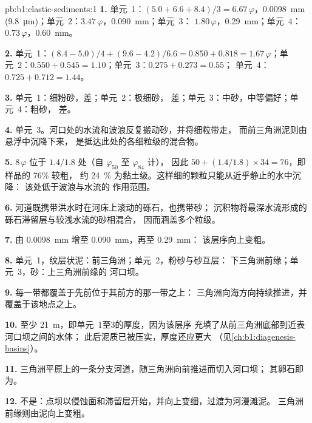 \begin{solution}{pb:b1:clastic-sediments:1}
\textbf{1.} 单元~1：$(5.0 + 6.6 + 8.4)/3 = 6.67\,\varphi$，\qty{0.0098}{mm}
(\qty{9.8}{\micro m})；单元~2：$3.47\,\varphi$，\qty{0.090}{mm}；单元~3：
$1.80\,\varphi$，\qty{0.29}{mm}；单元~4：$0.73\,\varphi$，\qty{0.60}{mm}。

\textbf{2.} 单元~1：$(8.4 - 5.0)/4 + (9.6 - 4.2)/6.6 = 0.850 + 0.818 =
1.67\,\varphi$；单元~2：$0.550 + 0.545 = 1.10$；单元~3：$0.275 + 0.273 = 0.55$；
单元~4：$0.725 + 0.712 = 1.44$。

\textbf{3.} 单元~1：细粉砂，差；单元~2：极细砂，
差；单元~3：中砂，中等偏好；单元~4：粗砂，
差。

\textbf{4.} 单元~3。河口处的水流和波浪反复搬动砂，并将细粒带走，
而前三角洲泥则由悬浮中沉降下来，
是抵达此处的各细粒级的混合物。

\textbf{5.} $8\,\varphi$ 位于 $1.4/1.8$ 处（自 $\varphi_{50}$ 至 $\varphi_{84}$ 计），
因此 $50 + (1.4/1.8) \times 34 = 76$，即样品的 76\% 较粗，
约 \qty{24}{\percent} 为黏土级。这样细的颗粒只能从近乎静止的水中沉降：
该处低于波浪与水流的
作用范围。

\textbf{6.} 河道既携带洪水时在河床上滚动的砾石，也携带砂；
沉积物将最深水流形成的砾石滞留层与较浅水流的砂相混合，
因而涵盖多个粒级。

\textbf{7.} 由 \qty{0.0098}{mm} 增至 \qty{0.090}{mm}，再至 \qty{0.29}{mm}：
该层序向上变粗。

\textbf{8.} 单元~1，纹层状泥：前三角洲；单元~2，粉砂与砂互层：
下三角洲前缘；单元~3，砂：上三角洲前缘的
河口坝。

\textbf{9.} 每一带都覆盖于先前位于其前方的那一带之上：
三角洲向海方向持续推进，并覆盖于该地点之上。

\textbf{10.} 至少 \qty{21}{m}，即单元~1至3的厚度，因为该层序
充填了从前三角洲底部到近表河口坝之间的水体；
此后泥质已被压实，厚度还应更大
（见\cref{ch:b1:diagenesis-basins}）。

\textbf{11.} 三角洲平原上的一条分支河道，随三角洲向前推进而切入河口坝；
其卵石即为。

\textbf{12.} 不是：点坝以侵蚀面和滞留层开始，并向上变细，过渡为河漫滩泥。
三角洲前缘则由泥向上变粗。


\end{solution}
